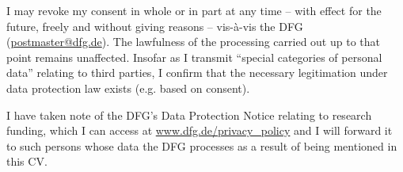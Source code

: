 \documentclass{scrartcl}
\begin{document}
I may revoke my consent in whole or in part at any time -- with effect for the future, freely and without giving reasons -- vis-à-vis the DFG (\url{postmaster@dfg.de}). The lawfulness of the processing carried out up to that point remains unaffected. Insofar as I transmit ``special categories of personal data'' relating to third parties, I confirm that the necessary legitimation under data protection law exists (e.g. based on consent).

I have taken note of the DFG's Data Protection Notice relating to research funding, which I can access at \url{www.dfg.de/privacy_policy} and I will forward it to such persons whose data the DFG processes as a result of being mentioned in this CV.
\end{document}
